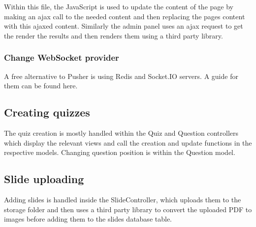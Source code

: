 Within this file, the JavaScript is used to update the content of the page by making an ajax call to the needed content and then replacing the pages content with this ajaxed content. Similarly the admin panel uses an ajax request to get the render the results and then renders them using a third party library.

\subsubsection{Change WebSocket provider}
A free alternative to Pusher is using Redis and Socket.IO servers. A guide for them can be found here\cite{broadcasting-socketio}. 

\subsection{Creating quizzes}
The quiz creation is mostly handled within the Quiz and Question controllers which display the relevant views and call the creation and update functions in the respective models. Changing question position is within the Question model.

\subsection{Slide uploading}
Adding slides is handled inside the SlideController, which uploads them to the storage folder and then uses a third party library to convert the uploaded PDF to images before adding them to the slides database table.